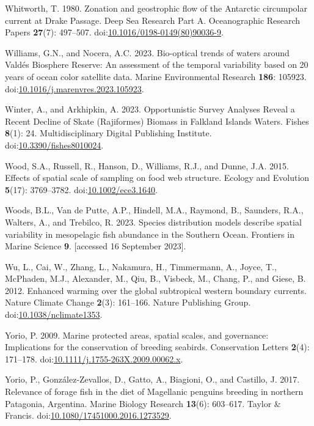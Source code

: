 \documentclass[
]{article}
\newlength{\cslhangindent}
\newenvironment{CSLReferences}[2] %
 {\begin{list}{}{%
  \setlength{\itemindent}{0pt}
  \setlength{\leftmargin}{0pt}
  \setlength{\parsep}{0pt}
  \ifodd #1
   \setlength{\leftmargin}{\cslhangindent}
   \setlength{\itemindent}{-1\cslhangindent}
  \fi
  \setlength{\itemsep}{#2\baselineskip}}}
 {\end{list}}
\begin{document}
\begin{CSLReferences}{1}{0}
Whitworth, T. 1980. Zonation and geostrophic flow of the {Antarctic}
circumpolar current at {Drake Passage}. Deep Sea Research Part A.
Oceanographic Research Papers \textbf{27}(7): 497--507.
doi:\href{https://doi.org/10.1016/0198-0149(80)90036-9}{10.1016/0198-0149(80)90036-9}.

Williams, G.N., and Nocera, A.C. 2023. Bio-optical trends of waters
around {Vald{é}s Biosphere Reserve}: {An} assessment of the temporal
variability based on 20 years of ocean color satellite data. Marine
Environmental Research \textbf{186}: 105923.
doi:\href{https://doi.org/10.1016/j.marenvres.2023.105923}{10.1016/j.marenvres.2023.105923}.

Winter, A., and Arkhipkin, A. 2023. Opportunistic {Survey Analyses
Reveal} a {Recent Decline} of {Skate} ({Rajiformes}) {Biomass} in
{Falkland Islands Waters}. Fishes \textbf{8}(1): 24. Multidisciplinary
Digital Publishing Institute.
doi:\href{https://doi.org/10.3390/fishes8010024}{10.3390/fishes8010024}.

Wood, S.A., Russell, R., Hanson, D., Williams, R.J., and Dunne, J.A.
2015. Effects of spatial scale of sampling on food web structure.
Ecology and Evolution \textbf{5}(17): 3769--3782.
doi:\href{https://doi.org/10.1002/ece3.1640}{10.1002/ece3.1640}.

Woods, B.L., Van de Putte, A.P., Hindell, M.A., Raymond, B., Saunders,
R.A., Walters, A., and Trebilco, R. 2023. Species distribution models
describe spatial variability in mesopelagic fish abundance in the
{Southern Ocean}. Frontiers in Marine Science \textbf{9}. {[}accessed 16
September 2023{]}.

Wu, L., Cai, W., Zhang, L., Nakamura, H., Timmermann, A., Joyce, T.,
McPhaden, M.J., Alexander, M., Qiu, B., Visbeck, M., Chang, P., and
Giese, B. 2012. Enhanced warming over the global subtropical western
boundary currents. Nature Climate Change \textbf{2}(3): 161--166. Nature
Publishing Group.
doi:\href{https://doi.org/10.1038/nclimate1353}{10.1038/nclimate1353}.

Yorio, P. 2009. Marine protected areas, spatial scales, and governance:
Implications for the conservation of breeding seabirds. Conservation
Letters \textbf{2}(4): 171--178.
doi:\href{https://doi.org/10.1111/j.1755-263X.2009.00062.x}{10.1111/j.1755-263X.2009.00062.x}.

Yorio, P., González-Zevallos, D., Gatto, A., Biagioni, O., and Castillo,
J. 2017. Relevance of forage fish in the diet of {Magellanic} penguins
breeding in northern {Patagonia}, {Argentina}. Marine Biology Research
\textbf{13}(6): 603--617. Taylor \& Francis.
doi:\href{https://doi.org/10.1080/17451000.2016.1273529}{10.1080/17451000.2016.1273529}.

\end{CSLReferences}
\end{document}
